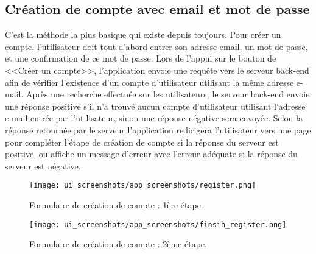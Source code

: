 \subsection{Création de compte avec email et mot de passe}
C'est la méthode la plus basique qui existe depuis toujours. Pour créer un compte, l'utilisateur doit tout d'abord entrer son adresse email, un mot de passe, et une confirmation de ce mot de passe. Lors de l'appui sur le bouton de <<Créer un compte>>, l'application envoie une requête vers le serveur back-end afin de vérifier l'existence d'un compte d'utilisateur utilisant la même adresse e-mail. Après une recherche effectuée sur les utilisateurs, le serveur back-end envoie une réponse positive s'il n'a trouvé aucun compte d'utilisateur utilisant l'adresse e-mail entrée par l'utilisateur, sinon une réponse négative sera envoyée. Selon la réponse retournée par le serveur l'application redirigera l'utilisateur vers une page pour compléter l'étape de création de compte si la réponse du serveur est positive, ou affiche un message d'erreur avec l'erreur adéquate si la réponse du serveur est négative.
\newpage
\begin{multicols}{2}
    \begin{figure}[H]
        \begin{center}
            \centering
            \texttt{[image: ui\_screenshots/app\_screenshots/register.png]}
            \captionsetup{justification=centering}
            \caption{Formulaire de création de compte : 1ère étape.}
            \label{fig:app_register}
        \end{center}
    \end{figure}
    \begin{figure}[H]
        \begin{center}
            \centering
            \texttt{[image: ui\_screenshots/app\_screenshots/finsih\_register.png]}
            \captionsetup{justification=centering}
            \caption{Formulaire de création de compte : 2ème étape.}
            \label{fig:app_finish_register}
        \end{center}
    \end{figure}
\end{multicols}

